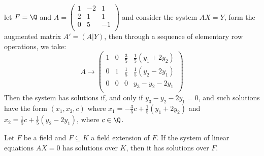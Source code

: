 \begin{example}
    let $F=\Q$ and  $A=\begin{pmatrix}
                            1 & -2 & 1 \\
                            2 &  1 & 1 \\
                            0 & 5 & -1 \\
                       \end{pmatrix}$ and consider the system $AX=Y$, form the augmented matrix
    $A'=(A|Y)$, then through a sequence of elementary row operations, we take:
        \begin{equation*}
            A \rightarrow \begin{pmatrix}
                1 & 0 & \frac{3}{5} & \frac{1}{5}(y_1+2y_2) \\
                0 & 1 & \frac{1}{5} & \frac{1}{5}(y_2-2y_1) \\
                0 & 0 & 0 & y_3-y_2-2y_1 \\
                \end{pmatrix}
        \end{equation*}
    Then the system has solutions if, and only if $y_3-y_2-2y_1=0$, and such solutions have the form
    $(x_1,x_2,c)$ where $x_1=-\frac{3}{5}c+\frac{1}{5}(y_1+2y_2)$ and
    $x_2=\frac{1}{5}c+\frac{1}{5}(y_2-2y_1)$, where $c \in \Q$.
\end{example}

\begin{lemma}\label{1.3.6}
    Let $F$ be a field and  $F \subseteq K$ a field extension of $F$. If the system of linear
    equations $AX=0$ has solutions over $K$, then it has solutions over $F$.
\end{lemma}
